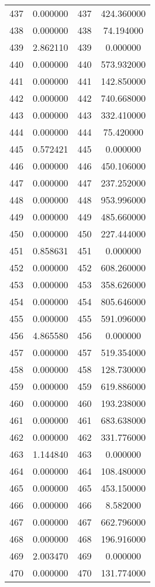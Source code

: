 \documentclass[12pt]{article}
\begin{document}
\begin{longtable}{@{}cccc@{}}
437 & 0.000000 & 437 & 424.360000 \\
438 & 0.000000 & 438 & 74.194000 \\
439 & 2.862110 & 439 & 0.000000 \\
440 & 0.000000 & 440 & 573.932000 \\
441 & 0.000000 & 441 & 142.850000 \\
442 & 0.000000 & 442 & 740.668000 \\
443 & 0.000000 & 443 & 332.410000 \\
444 & 0.000000 & 444 & 75.420000 \\
445 & 0.572421 & 445 & 0.000000 \\
446 & 0.000000 & 446 & 450.106000 \\
447 & 0.000000 & 447 & 237.252000 \\
448 & 0.000000 & 448 & 953.996000 \\
449 & 0.000000 & 449 & 485.660000 \\
450 & 0.000000 & 450 & 227.444000 \\
451 & 0.858631 & 451 & 0.000000 \\
452 & 0.000000 & 452 & 608.260000 \\
453 & 0.000000 & 453 & 358.626000 \\
454 & 0.000000 & 454 & 805.646000 \\
455 & 0.000000 & 455 & 591.096000 \\
456 & 4.865580 & 456 & 0.000000 \\
457 & 0.000000 & 457 & 519.354000 \\
458 & 0.000000 & 458 & 128.730000 \\
459 & 0.000000 & 459 & 619.886000 \\
460 & 0.000000 & 460 & 193.238000 \\
461 & 0.000000 & 461 & 683.638000 \\
462 & 0.000000 & 462 & 331.776000 \\
463 & 1.144840 & 463 & 0.000000 \\
464 & 0.000000 & 464 & 108.480000 \\
465 & 0.000000 & 465 & 453.150000 \\
466 & 0.000000 & 466 & 8.582000 \\
467 & 0.000000 & 467 & 662.796000 \\
468 & 0.000000 & 468 & 196.916000 \\
469 & 2.003470 & 469 & 0.000000 \\
470 & 0.000000 & 470 & 131.774000 \\

\end{longtable}
\end{document}
